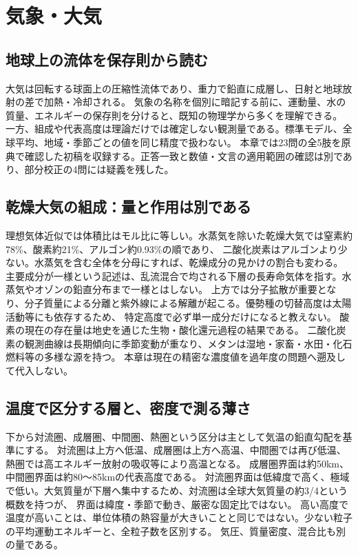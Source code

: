 \chapter{気象・大気}
\section{地球上の流体を保存則から読む}
大気は回転する球面上の圧縮性流体であり、重力で鉛直に成層し、日射と地球放射の差で加熱・冷却される。
気象の名称を個別に暗記する前に、運動量、水の質量、エネルギーの保存則を分けると、既知の物理学から多くを理解できる。
一方、組成や代表高度は理論だけでは確定しない観測量である。標準モデル、全球平均、地域・季節ごとの値を同じ精度で扱わない。
本章では23問の全5肢を原典で確認した初稿を収録する。正答一致と数値・文言の適用範囲の確認は別であり、部分校正の4問には疑義を残した。

\section{乾燥大気の組成：量と作用は別である}
\label{theory:atmosphere:composition}
理想気体近似では体積比はモル比に等しい。水蒸気を除いた乾燥大気では窒素約78\%、酸素約21\%、アルゴン約0.93\%の順であり、
二酸化炭素はアルゴンより少ない\cite{atm_noaa_composition}。水蒸気を含む全体を分母にすれば、乾燥成分の見かけの割合も変わる。
主要成分が一様という記述は、乱流混合で均される下層の長寿命気体を指す。水蒸気やオゾンの鉛直分布まで一様とはしない。
上方では分子拡散が重要となり、分子質量による分離と紫外線による解離が起こる。優勢種の切替高度は太陽活動等にも依存するため、
特定高度で必ず単一成分だけになると教えない。
酸素の現在の存在量は地史を通じた生物・酸化還元過程の結果である。
二酸化炭素の観測曲線は長期傾向に季節変動が重なり、メタンは湿地・家畜・水田・化石燃料等の多様な源を持つ\cite{atm_noaa_ghg}。
本章は現在の精密な濃度値を過年度の問題へ遡及して代入しない。

\section{温度で区分する層と、密度で測る薄さ}
\label{theory:atmosphere:layers}
下から対流圏、成層圏、中間圏、熱圏という区分は主として気温の鉛直勾配を基準にする。
対流圏は上方へ低温、成層圏は上方へ高温、中間圏では再び低温、熱圏では高エネルギー放射の吸収等により高温となる。
成層圏界面は約50km、中間圏界面は約80〜85kmの代表高度である\cite{atm_noaa_layers}。
対流圏界面は低緯度で高く、極域で低い。大気質量が下層へ集中するため、対流圏は全球大気質量の約3/4という概数を持つが、
界面は緯度・季節で動き、厳密な固定比ではない。
高い高度で温度が高いことは、単位体積の熱容量が大きいことと同じではない。少ない粒子の平均運動エネルギーと、全粒子数を区別する。
気圧、質量密度、混合比も別の量である。

